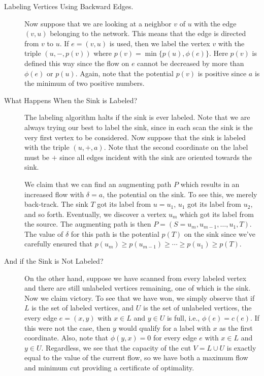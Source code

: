 \begin{description}
\item[Labeling Vertices Using Backward Edges.]  Now suppose that we
  are looking at a neighbor $v$ of $u$ with the edge $(v,u)$ belonging
  to the network.  This means that the edge is directed from $v$ to
  $u$.  If $e=(v,u)$ is used, then we label the vertex $v$ with the
  triple $(u,-,p(v))$ where $p(v)=\min\{p(u),\phi(e)\}$. Here $p(v)$
  is defined this way since the flow on $e$ cannot be decreased by
  more than $\phi(e)$ or $p(u)$.  Again, note that the potential
  $p(v)$ is positive since $a$ is the minimum of two positive numbers.


\item[What Happens When the Sink is Labeled?]  The labeling algorithm
  halts if the sink is ever labeled.  Note that we are always trying
  our best to label the sink, since in each scan the sink is the very
  first vertex to be considered.  Now suppose that the sink is labeled
  with the triple $(u,+,a)$.  Note that the second coordinate on the
  label must be $+$ since all edges incident with the sink are
  oriented towards the sink.

  We claim that we can find an augmenting path $P$ which results in an
  increased flow with $\delta=a$, the potential on the sink.  To see
  this, we merely back-track.  The sink $T$ got its label from
  $u=u_1$, $u_1$ got its label from $u_2$, and so forth.  Eventually,
  we discover a vertex $u_m$ which got its label from the source.  The
  augmenting path is then $P=(S=u_m,u_{m-1},\dots,u_1,T)$. The value
  of $\delta$ for this path is the potential $p(T)$ on the sink since
  we've carefully ensured that $p(u_m)\geq p(u_{m-1})\geq\cdots\geq
  p(u_1)\geq p(T)$.

\item[And if the Sink is Not Labeled?]  On the other hand, suppose we
  have scanned from every labeled vertex and there are still unlabeled
  vertices remaining, one of which is the sink.  Now we claim victory.
  To see that we have won, we simply observe that if $L$ is the set of
  labeled vertices, and $U$ is the set of unlabeled vertices, the
  every edge $e=(x,y)$ with $x\in L$ and $y\in U$ is full, i.e.,
  $\phi(e)=c(e)$.  If this were not the case, then $y$ would qualify
  for a label with $x$ as the first coordinate.  Also, note that
  $\phi(y,x)=0$ for every edge $e$ with $x\in L$ and $y\in U$.
  Regardless, we see that the capacity of the cut $V=L\cup U$ is
  exactly equal to the value of the current flow, so we have both a
  maximum flow and minimum cut providing a certificate of optimality.
\end{description}

